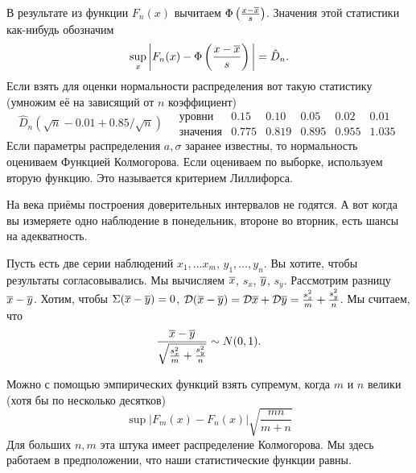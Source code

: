 В результате из функции $F_n(x)$ вычитаем $\Phi\left( \frac{x-\overline{x}}s \right)$. Значения этой статистики как-нибудь обозначим
\[
  \sup\limits_x \bigg| F_n(x) - \Phi\left( \frac{x - \overline{x}}{s} \right)\bigg| = \hat D_n.
\]
Если взять для оценки нормальности распределения вот такую статистику (умножим её на зависящий от $n$ коэффициент)
\[
  \hat D_n(\sqrt{n} - 0.01 + 0.85/\sqrt n)\quad
  \begin{matrix}
\text{уровни}&  0.15 & 0.10 & 0.05 & 0.02 & 0.01\\
\text{значения}& 0.775 & 0.819 & 0.895 & 0.955 & 1.035
\end{matrix}
\]
Если параметры распределения $a,\sigma$ заранее известны, то нормальность оцениваем Функцией Колмогорова. Если оцениваем по выборке, используем вторую функцию. Это называется критерием Лиллифорса.

На века приёмы построения доверительных интервалов не годятся. А вот когда вы измеряете одно наблюдение в понедельник, второне во вторник, есть шансы на адекватность.

Пусть есть две серии наблюдений $x_1,\dots x_m$, $y_1,\dots,y_n$. Вы хотите, чтобы результаты согласовывались. Мы вычисляем $\overline{x}$, $s_x$, $\overline{y}$, $s_y$. Рассмотрим разницу $\overline{x} - \overline{y}$. Хотим, чтобы $\Sigma(\overline{x} - \overline{y})=0$, $\mathcal D(\overline{x} - \overline{y}) = \mathcal D\overline{x} + \mathcal D\overline{y} = \frac{s^2_x}m + \frac{s^2_y}n$. Мы считаем, что
\[
  \frac{\overline{x}-\overline{y}}{\sqrt{\frac{s_x^2}{m} + \frac{s^2_y}{n}}} \sim N(0,1).
\]

Можно с помощью эмпирических функций взять супремум, когда $m$ и $n$ велики (хотя бы по несколько десятков)
\[
  \sup\big| F_m(x) - F_n(x)\big| \sqrt{\frac{mn}{m+n}}
\]
Для больших $n,m$ эта штука имеет распределение Колмогорова. Мы здесь работаем в предположении, что наши статистические функции равны.

